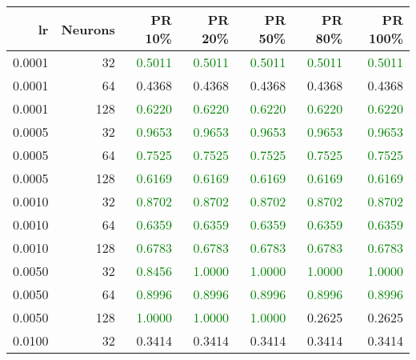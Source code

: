 \begin{tabular}{rrrrrrr}
\toprule
lr & Neurons & PR 10\% & PR 20\% & PR 50\% & PR 80\% & PR 100\% \\
\midrule
0.0001 & 32 & \textcolor{green} {0.5011} & \textcolor{green} {0.5011} & \textcolor{green} {0.5011} & \textcolor{green} {0.5011} & \textcolor{green} {0.5011} \\
0.0001 & 64 & \textcolor{blu} {0.4368} & \textcolor{blu} {0.4368} & \textcolor{blu} {0.4368} & \textcolor{blu} {0.4368} & \textcolor{blu} {0.4368} \\
0.0001 & 128 & \textcolor{green} {0.6220} & \textcolor{green} {0.6220} & \textcolor{green} {0.6220} & \textcolor{green} {0.6220} & \textcolor{green} {0.6220} \\
0.0005 & 32 & \textcolor{green} {0.9653} & \textcolor{green} {0.9653} & \textcolor{green} {0.9653} & \textcolor{green} {0.9653} & \textcolor{green} {0.9653} \\
0.0005 & 64 & \textcolor{green} {0.7525} & \textcolor{green} {0.7525} & \textcolor{green} {0.7525} & \textcolor{green} {0.7525} & \textcolor{green} {0.7525} \\
0.0005 & 128 & \textcolor{green} {0.6169} & \textcolor{green} {0.6169} & \textcolor{green} {0.6169} & \textcolor{green} {0.6169} & \textcolor{green} {0.6169} \\
0.0010 & 32 & \textcolor{green} {0.8702} & \textcolor{green} {0.8702} & \textcolor{green} {0.8702} & \textcolor{green} {0.8702} & \textcolor{green} {0.8702} \\
0.0010 & 64 & \textcolor{green} {0.6359} & \textcolor{green} {0.6359} & \textcolor{green} {0.6359} & \textcolor{green} {0.6359} & \textcolor{green} {0.6359} \\
0.0010 & 128 & \textcolor{green} {0.6783} & \textcolor{green} {0.6783} & \textcolor{green} {0.6783} & \textcolor{green} {0.6783} & \textcolor{green} {0.6783} \\
0.0050 & 32 & \textcolor{green} {0.8456} & \textcolor{green} {1.0000} & \textcolor{green} {1.0000} & \textcolor{green} {1.0000} & \textcolor{green} {1.0000} \\
0.0050 & 64 & \textcolor{green} {0.8996} & \textcolor{green} {0.8996} & \textcolor{green} {0.8996} & \textcolor{green} {0.8996} & \textcolor{green} {0.8996} \\
0.0050 & 128 & \textcolor{green} {1.0000} & \textcolor{green} {1.0000} & \textcolor{green} {1.0000} & \textcolor{blu} {0.2625} & \textcolor{blu} {0.2625} \\
0.0100 & 32 & \textcolor{blu} {0.3414} & \textcolor{blu} {0.3414} & \textcolor{blu} {0.3414} & \textcolor{blu} {0.3414} & \textcolor{blu} {0.3414} \\

\end{tabular}

